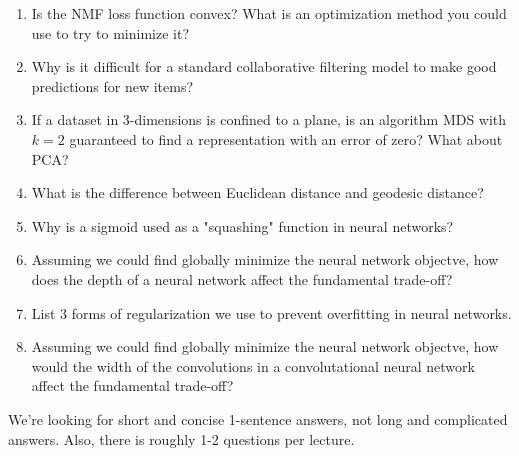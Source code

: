 \documentclass{article}
\def\blu#1{{\color{blu}#1}}
\def\enum#1{\begin{enumerate}#1\end{enumerate}}
\begin{document}
\blu{
\enum{
\item Is the NMF loss function convex? What is an optimization method you could use to try to minimize it?
\item Why is it difficult for a standard collaborative filtering model  to make good predictions for new  items?
\item If a dataset in 3-dimensions is confined to a plane, is an algorithm MDS with $k=2$ guaranteed to find a representation with an error of zero? What about PCA?
\item What is the difference between Euclidean distance and geodesic distance?
\item Why is a sigmoid used as a "squashing" function in neural networks?
\item Assuming we could find globally minimize the neural network objectve, how does the depth of a neural network affect the fundamental trade-off?
\item List 3 forms of regularization we use to prevent overfitting in neural networks.
\item  Assuming we could find globally minimize the neural network objectve, how would the width of the convolutions in a convolutational neural network affect the fundamental trade-off?
}
}

We're looking for short and concise 1-sentence answers, not long and complicated answers. Also, there is roughly 1-2 questions per lecture.
\end{document}
